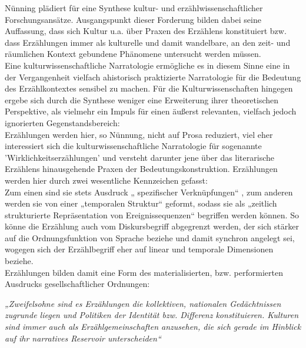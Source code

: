  Nünning plädiert für eine Synthese kultur-
und erzählwissenschaftlicher Forschungsansätze.\footnotemark {}
Ausgangspunkt dieser Forderung
bilden dabei seine Auffassung, dass sich Kultur u.a. über Praxen des Erzählens
konstituiert bzw. dass Erzählungen immer als kulturelle und damit wandelbare,
an den zeit- und räumlichen Kontext gebundene Phänomene untersucht werden
müssen. \\
Eine kulturwissenschaftliche Narratologie ermögliche es in diesem Sinne
eine in der Vergangenheit vielfach ahistorisch praktizierte Narratologie für
die Bedeutung des Erzählkontextes sensibel zu machen. Für die
Kulturwissenschaften hingegen ergebe sich durch die Synthese weniger eine
Erweiterung ihrer theoretischen Perspektive, als vielmehr ein Impuls für einen
äußerst relevanten, vielfach jedoch ignorierten Gegenstandsbereich: \\
Erzählungen
werden hier, so Nünnung, nicht auf Prosa reduziert, viel eher interessiert sich
die kulturwissenschaftliche Narratologie für sogenannte
'Wirklichkeitserzählungen' und versteht darunter jene über das literarische
Erzählens hinausgehende Praxen der Bedeutungskonstruktion. Erzählungen werden
hier durch zwei wesentliche Kennzeichen gefasst: \\
Zum einen sind sie stets
Ausdruck „ spezifischer Verknüpfungen“\footnotemark
{}, zum anderen werden sie von einer
„temporalen Struktur“\footnotemark {}  geformt, sodass sie als „zeitlich strukturierte
Repräsentation von Ereignissequenzen“\footnotemark {} begriffen werden können. So könne die
Erzählung auch vom Diskursbegriff abgegrenzt werden, der sich stärker auf die
Ordnungsfunktion von Sprache beziehe und damit synchron angelegt sei, wogegen
sich der Erzählbegriff eher auf linear und temporale Dimensionen
beziehe.\footnotemark {}\\
Erzählungen bilden damit eine Form des materialisierten, bzw. performierten
Ausdrucks gesellschaftlicher Ordnungen:
\begin{myenv}
  \textit{
  „Zweifelsohne sind es Erzählungen die kollektiven, nationalen
  Gedächtnissen zugrunde liegen und Politiken der Identität bzw. Differenz
  konstituieren. Kulturen sind immer auch als Erzählgemeinschaften anzusehen,
  die sich gerade im Hinblick auf ihr narratives Reservoir unterscheiden“\footnotemark {}
  } \end{myenv}
